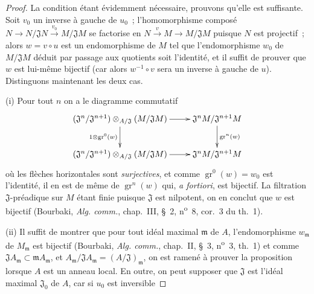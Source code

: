 \begin{proof}
La condition étant évidemment nécessaire, prouvons qu'elle est suffisante.
Soit $v_0$ un inverse à gauche de $u_0$~; l'homomorphisme composé
$N\to N/\mathfrak JN\xrightarrow{v_0}M/\mathfrak JM$ se factorise en
$N\xrightarrow{v}M\to M/\mathfrak JM$ puisque $N$ est projectif~; alors
$w=v\circ u$ est un endomorphisme de $M$ tel que l'endomorphisme $w_0$ de
$M/\mathfrak JM$ déduit par passage aux quotients soit l'identité, et il suffit
de prouver que $w$ est lui-même bijectif (car alors $w^{-1}\circ v$ sera un
inverse à gauche de $u$). Distinguons maintenant les deux cas.

(i) Pour tout $n$ on a le diagramme commutatif
\[
  \xymatrix{
    (\mathfrak J^n/\mathfrak J^{n+1})\otimes_{A/\mathfrak J}
      (M/\mathfrak JM)\ar[r]\ar[d]_{1\otimes\operatorname{gr}^0(w)} &
      \mathfrak J^nM/\mathfrak J^{n+1}M\ar[d]^{\operatorname{gr}^n(w)}\\
    (\mathfrak J^n/\mathfrak J^{n+1})\otimes_{A/\mathfrak J}
      (M/\mathfrak JM)\ar[r] & \mathfrak J^nM/\mathfrak J^{n+1}M
  }
\]
où les flèches horizontales sont \emph{surjectives}, et comme
$\operatorname{gr}^0(w)=w_0$ est l'identité, il en est de même de
$\operatorname{gr}^n(w)$ qui, \emph{a fortiori}, est bijectif. La filtration
$\mathfrak J$-préadique sur $M$ étant finie puisque $\mathfrak J$ est
nilpotent, on en conclut que $w$ est bijectif (Bourbaki, \emph{Alg. comm.},
chap.~III, §~2, n\textsuperscript{o}~8, cor.~3 du th.~1).

(ii) Il suffit de montrer que pour tout idéal maximal $\mathfrak m$ de $A$,
l'endomorphisme $w_{\mathfrak m}$ de $M_{\mathfrak m}$ est bijectif
(Bourbaki, \emph{Alg. comm.}, chap.~II, §~3, n\textsuperscript{o}~3, th.~1)
et comme $\mathfrak JA_{\mathfrak m}\subset\mathfrak mA_{\mathfrak m}$, et
$A_{\mathfrak m}/\mathfrak JA_{\mathfrak m}=(A/\mathfrak J)_{\mathfrak m}$,
on est ramené à prouver la proposition lorsque $A$ est un anneau local. En
outre, on peut supposer que $\mathfrak J$ est l'idéal maximal
$\mathfrak J_0$ de $A$, car si $u_0$ est inversible



\end{proof}
